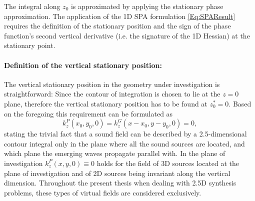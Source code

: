 The integral along $z_0$ is approximated by applying the stationary phase approximation.
The application of the 1D SPA formulation \eqref{Eq:SPAResult} requires the definition of the stationary position and the sign of the phase function's second vertical derivative (i.e. the signature of the 1D Hessian) at the stationary point.

\paragraph{Definition of the vertical stationary position:}
The vertical stationary position in the geometry under investigation is straightforward:
Since the contour of integration is chosen to lie at the $z=0$ plane, therefore the vertical stationary position has to be found at $z_0^* = 0$.
Based on the foregoing this requirement can be formulated as
\begin{equation}
k_z^P(x_0,y_0,0) = k_z^G(x-x_0,y-y_0,0) = 0,
\end{equation}
stating the trivial fact that a sound field can be described by a 2.5-dimensional contour integral only in the plane where all the sound sources are located, and which plane the emerging waves propagate parallel with.
In the plane of investigation $k_z^P(x,y,0) \equiv 0$ holds for the field of 3D sources located at the plane of investigation and of 2D sources being invariant along the vertical dimension.
Throughout the present thesis when dealing with 2.5D synthesis problems, these types of virtual fields are considered exclusively.

